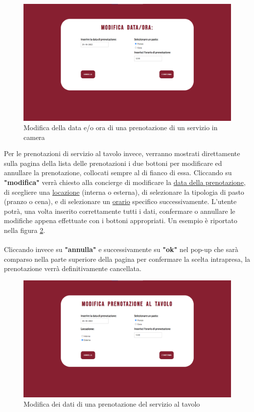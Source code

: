 \documentclass [a4paper, 12pt]{book}
\begin{document}
\begin{figure}[h]
\centering
\includegraphics[scale=0.2]{ModificaDataOraPrenotazioneSC.png}
\caption{Modifica della data e/o ora di una prenotazione di un servizio in camera}
\label{ModificaDataOraPrenotazioneSC}
\end{figure}

Per le prenotazioni di servizio al tavolo invece, verranno mostrati direttamente sulla pagina della lista delle prenotazioni i due bottoni per modificare ed annullare la prenotazione, collocati sempre al di fianco di essa. Cliccando su \textbf{"modifica"} verrà chiesto alla concierge di modificare la \underline{data della prenotazione}, di scegliere una \underline{locazione} (interna o esterna), di selezionare la tipologia di pasto (pranzo o cena), e di selezionare un \underline{orario} specifico successivamente. L'utente potrà, una volta inserito correttamente tutti i dati, confermare o annullare le modifiche appena effettuate con i bottoni appropriati. Un esempio è riportato nella figura \ref{ModificaPrenotazioneTavolo}. \\\\
Cliccando invece su \textbf{"annulla"} e successivamente su \textbf{"ok"} nel pop-up che sarà comparso nella parte superiore della pagina per confermare la scelta intrapresa, la prenotazione verrà definitivamente cancellata.

\begin{figure}[h]
\centering
\includegraphics[scale=0.3]{ModificaPrenotazioneTavolo.png}
\caption{Modifica dei dati di una prenotazione del servizio al tavolo}
\label{ModificaPrenotazioneTavolo}
\end{figure}
\end{document}
